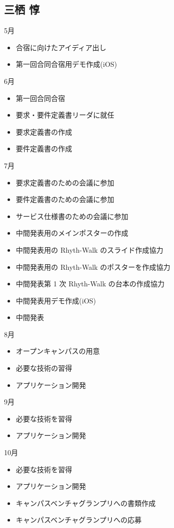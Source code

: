 \subsection{三栖 惇}
5月
\begin{itemize}
\item 合宿に向けたアイディア出し
\item 第一回合同合宿用デモ作成(iOS)
\end{itemize}
6月
\begin{itemize}
\item 第一回合同合宿
\item 要求・要件定義書リーダに就任
\item 要求定義書の作成
\item 要件定義書の作成
\end{itemize}
7月
\begin{itemize}
\item 要求定義書のための会議に参加
\item 要件定義書のための会議に参加
\item サービス仕様書のための会議に参加
\item 中間発表用のメインポスターの作成
\item 中間発表用の Rhyth-Walk のスライド作成協力
\item 中間発表用の Rhyth-Walk のポスターを作成協力
\item 中間発表第 1 次 Rhyth-Walk の台本の作成協力
\item 中間発表用デモ作成(iOS)
\item 中間発表
\end{itemize}
8月
\begin{itemize}
\item オープンキャンパスの用意
\item 必要な技術の習得
\item アプリケーション開発
\end{itemize}
9月
\begin{itemize}
\item 必要な技術を習得
\item アプリケーション開発
\end{itemize}
10月
\begin{itemize}
\item 必要な技術を習得
\item アプリケーション開発
\item キャンパスベンチャグランプリへの書類作成
\item キャンパスベンチャグランプリへの応募

\end{itemize}

